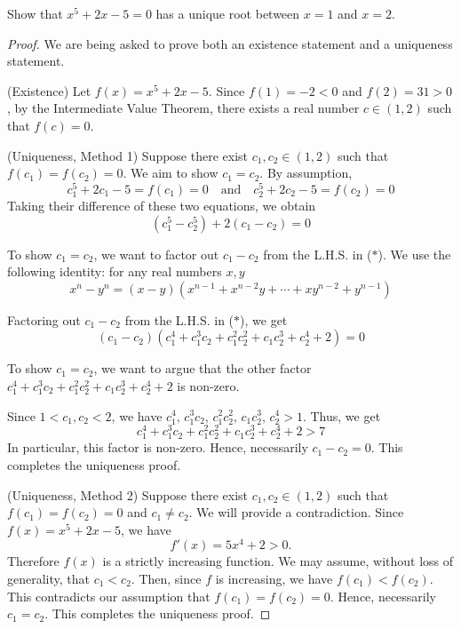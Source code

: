 \vspace*{1em}

\begin{example}\label{example:lec13-ex1}
Show that $x^5 + 2x - 5 = 0$ has a unique root between $x = 1$ and $x = 2$.
\end{example}
\begin{proof}
We are being asked to prove both an existence statement and a uniqueness statement.
\item[] (Existence)
Let $f(x) = x^5 + 2x - 5$. Since $f(1) = -2 < 0$ and $f(2) = 31 > 0$, by the Intermediate Value Theorem, there exists a real number $c \in (1,2)$ such that $f(c) = 0$.\\
\item[] (Uniqueness, Method 1)
Suppose there exist $c_1,c_2 \in (1,2)$ such that $f(c_1) = f(c_2) = 0$. We aim to show $c_1 = c_2$. By assumption,
\[c_1^5 + 2c_1 - 5 = f(c_1) = 0 \quad \text{and} \quad c_2^5 + 2c_2 - 5 = f(c_2) = 0\]
Taking their difference of these two equations, we obtain
\[(c_1^5 - c_2^5) + 2(c_1 - c_2) = 0\tag{$*$}\]
\begin{subproof}
To show $c_1 = c_2$, we want to factor out $c_1 - c_2$ from the L.H.S. in ($*$). We use the following identity: for any real numbers $x,y$
\[x^n - y^n = (x-y)(x^{n-1} + x^{n-2}y + \cdots + xy^{n-2} + y^{n-1})\]
\end{subproof}
\vspace*{0.5em}
Factoring out $c_1 - c_2$ from the L.H.S. in ($*$), we get
\[(c_1 - c_2)(c_1^4 + c_1^3c_2 + c_1^2c_2^2 + c_1c_2^3 + c_2^4 + 2) = 0\]
\begin{subproof}
To show $c_1 = c_2$, we want to argue that the other factor $c_1^4 + c_1^3c_2 + c_1^2c_2^2 + c_1c_2^3 + c_2^4 + 2$ is non-zero.
\end{subproof}
\vspace*{0.5em}
Since $1<c_1,c_2 < 2$, we have $c_1^4,\,c_1^3c_2,\,c_1^2c_2^2,\,c_1c_2^3,\,c_2^4 > 1$. Thus, we get 
\[c_1^4 + c_1^3c_2 + c_1^2c_2^2 + c_1c_2^3 + c_2^4 + 2 > 7\]
In particular, this factor is non-zero. Hence, necessarily $c_1 - c_2 = 0$. This completes the uniqueness proof.\\
\item[] (Uniqueness, Method 2) Suppose there exist $c_1,c_2 \in (1,2)$ such that $f(c_1) = f(c_2) = 0$ and $c_1 \neq c_2$. We will provide a contradiction. Since $f(x) = x^5 + 2x - 5$, we have 
\[f'(x) = 5x^4 + 2 > 0.\]
Therefore $f(x)$ is a strictly increasing function. We may assume, without loss of generality, that $c_1 < c_2$. Then, since $f$ is increasing, we have $f(c_1) < f(c_2)$. This contradicts our assumption that $f(c_1) = f(c_2) = 0$. Hence, necessarily $c_1 = c_2$. This completes the uniqueness proof.
\end{proof}

